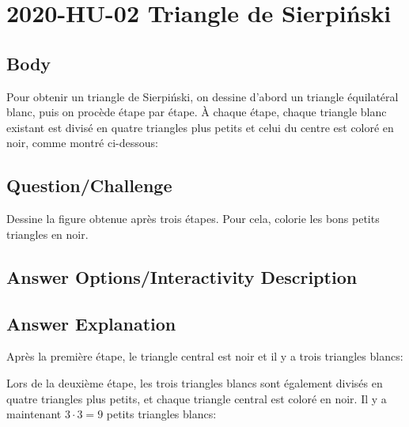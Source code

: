 \documentclass[a4paper,11pt]{report}
\newcommand{\taskGraphicsFolder}{..}
\begin{document}
\section*{\centering{} 2020-HU-02 Triangle de Sierpiński}


\subsection*{Body}

Pour obtenir un triangle de Sierpiński, on dessine d’abord un triangle équilatéral blanc, puis on procède étape par étape. À chaque étape, chaque triangle blanc existant est divisé en quatre triangles plus petits et celui du centre est coloré en noir, comme montré ci-dessous:

{\centering%
\par}

{\em

\subsection*{Question/Challenge}

Dessine la figure obtenue après trois étapes. Pour cela, colorie les bons petits triangles en noir.

{\centering%
\par}

}\begingroup
\renewcommand{\arraystretch}{1.5}
\subsection*{Answer Options/Interactivity Description}



\endgroup

\subsection*{Answer Explanation}

Après la première étape, le triangle central est noir et il y a trois triangles blancs:

{\centering%
\par}

Lors de la deuxième étape, les trois triangles blancs sont également divisés en quatre triangles plus petits, et chaque triangle central est coloré en noir. Il y a maintenant ${3 \cdot 3 = 9}$ petits triangles blancs:
\end{document}
